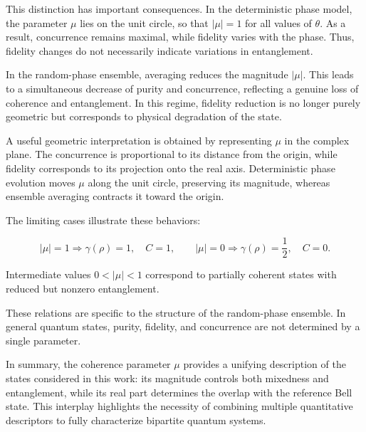 \medskip

This distinction has important consequences. In the deterministic phase model, the parameter \( \mu \) lies on the unit circle, so that \( |\mu|=1 \) for all values of \( \theta \). As a result, concurrence remains maximal, while fidelity varies with the phase. Thus, fidelity changes do not necessarily indicate variations in entanglement.

\medskip

In the random-phase ensemble, averaging reduces the magnitude \( |\mu| \). This leads to a simultaneous decrease of purity and concurrence, reflecting a genuine loss of coherence and entanglement. In this regime, fidelity reduction is no longer purely geometric but corresponds to physical degradation of the state.

\medskip

A useful geometric interpretation is obtained by representing \( \mu \) in the complex plane. The concurrence is proportional to its distance from the origin, while fidelity corresponds to its projection onto the real axis. Deterministic phase evolution moves \( \mu \) along the unit circle, preserving its magnitude, whereas ensemble averaging contracts it toward the origin.

\medskip

The limiting cases illustrate these behaviors:

\begin{equation}
|\mu|=1
\Rightarrow
\gamma(\rho)=1,
\quad
C=1,
\qquad
|\mu|=0
\Rightarrow
\gamma(\rho)=\frac{1}{2},
\quad
C=0.
\label{eq:coherence_parameter_limiting_cases}
\end{equation}

Intermediate values \( 0<|\mu|<1 \) correspond to partially coherent states with reduced but nonzero entanglement.

\medskip

These relations are specific to the structure of the random-phase ensemble. In general quantum states, purity, fidelity, and concurrence are not determined by a single parameter.

\medskip

In summary, the coherence parameter \( \mu \) provides a unifying description of the states considered in this work: its magnitude controls both mixedness and entanglement, while its real part determines the overlap with the reference Bell state. This interplay highlights the necessity of combining multiple quantitative descriptors to fully characterize bipartite quantum systems.

